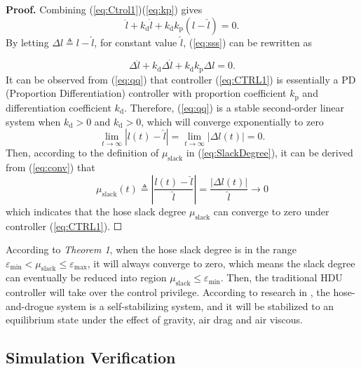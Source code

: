 \textbf{Proof.} Combining (\ref{eq:Ctrol1})(\ref{eq:kp}) gives
\begin{equation}
\ddot{l}+k_{\text{d}}\dot{l}+k_{\text{d}}k_\text{p}\left(l-\hat{l}\right)=0.\label{eq:sss}
\end{equation}
By letting $\Delta l\triangleq l-\hat{l}$, for constant value $\hat{l}$,
(\ref{eq:sss}) can be rewritten as

\begin{equation}
\Delta\ddot{l}+k_{\text{d}}\Delta\dot{l}+k_{\text{d}}k_\text{p}\Delta l=0.\label{eq:qq}
\end{equation}
It can be observed from (\ref{eq:qq}) that controller (\ref{eq:CTRL1})
is essentially a PD (Proportion Differentiation) controller with proportion
coefficient $k_\text{p}$ and differentiation coefficient $k_{\text{d}}$. Therefore,
(\ref{eq:qq}) is a stable second-order linear system when $k_{\text{d}}>0$
and $k_{\text{d}}>0$, which will converge exponentially to zero
\begin{equation}
\lim_{t\rightarrow\infty}\left|l\left(t\right)-\hat{l}\right|=\lim_{t\rightarrow\infty}\left|\Delta l\left(t\right)\right|=0.\label{eq:conv}
\end{equation}
Then, according to the definition of $\mu_\text{slack}$ in (\ref{eq:SlackDegree}),
it can be derived from (\ref{eq:conv}) that
\begin{equation}
\mu_\text{slack}\left(t\right)\triangleq\left|\frac{l\left(t\right)-\hat{l}}{\hat{l}}\right|=\frac{\left|\Delta l\left(t\right)\right|}{\hat{l}}\rightarrow0\label{eq:aaa}
\end{equation}
which indicates that the hose slack degree $\mu_\text{slack}$ can converge
to zero under controller (\ref{eq:CTRL1}). $\Square$

According to \textit{Theorem 1}, when the hose slack degree is in
the range $\varepsilon_{\min}<\mu_\text{slack}\leq\varepsilon_{\max}$,
it will always converge to zero, which means the slack degree can
eventually be reduced into region $\mu_\text{slack}\leq\varepsilon_{\min}$.
Then, the traditional HDU controller will take over the control privilege.
According to research in \cite{dai2018terminal}, the hose-and-drogue
system is a self-stabilizing system, and it will be stabilized to
an equilibrium state under the effect of gravity, air drag and air
viscous.

\subsection{Simulation Verification}

